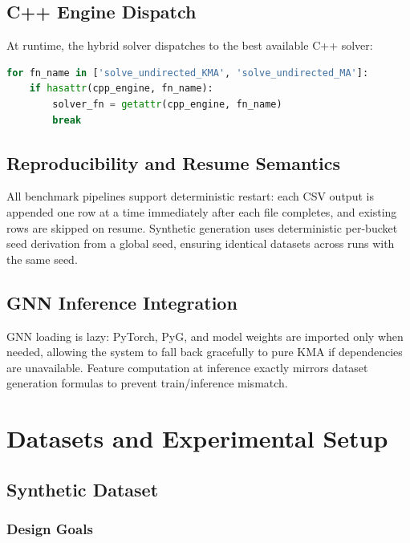 \documentclass[10pt,a4paper]{report}
\theoremstyle{definition}
\begin{document}
\section{C++ Engine Dispatch}

At runtime, the hybrid solver dispatches to the best available C++ solver:

\begin{lstlisting}[language=Python, caption=Solver dispatch in run\_hybrid.py]
for fn_name in ['solve_undirected_KMA', 'solve_undirected_MA']:
    if hasattr(cpp_engine, fn_name):
        solver_fn = getattr(cpp_engine, fn_name)
        break
\end{lstlisting}

\section{Reproducibility and Resume Semantics}

All benchmark pipelines support deterministic restart: each CSV output is appended one row at a time immediately after each file completes, and existing rows are skipped on resume. Synthetic generation uses deterministic per-bucket seed derivation from a global seed, ensuring identical datasets across runs with the same seed.

\section{GNN Inference Integration}

GNN loading is lazy: PyTorch, PyG, and model weights are imported only when needed, allowing the system to fall back gracefully to pure KMA if dependencies are unavailable. Feature computation at inference exactly mirrors dataset generation formulas to prevent train/inference mismatch.

\chapter{Datasets and Experimental Setup}
\label{ch:experiments}

\section{Synthetic Dataset}

\subsection{Design Goals}
\end{document}
